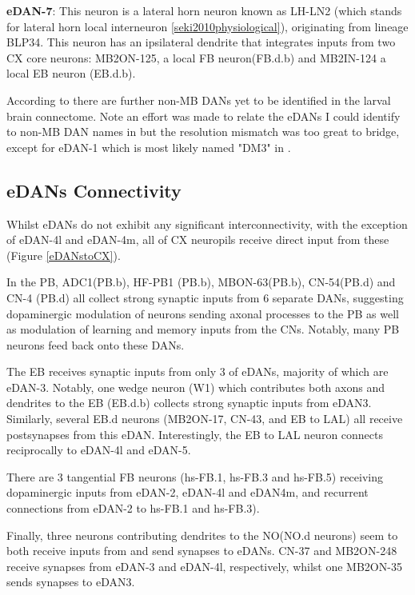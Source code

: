     \textbf{eDAN-7}: 
    This neuron is a lateral horn neuron known as LH-LN2 (which stands for lateral horn local interneuron \ref{seki2010physiological}), originating from lineage BLP34. This neuron has an ipsilateral dendrite that integrates inputs from two CX core neurons: MB2ON-125, a local FB neuron(FB.d.b) and MB2IN-124 a local EB neuron (EB.d.b). 

    According to \citep{selcho2009thgal4} there are further non-MB DANs yet to be identified in the larval brain connectome. Note an effort was made to relate the eDANs I could identify to non-MB DAN names in \citep{selcho2009thgal4} but the resolution mismatch was too great to bridge, except for eDAN-1 which is most likely named "DM3" in \citep{selcho2009thgal4}.

    \subsection{eDANs Connectivity}
     Whilst eDANs do not exhibit any significant interconnectivity, with the exception of eDAN-4l and eDAN-4m, all of CX neuropils receive direct input from these (Figure \ref{eDANstoCX}). 

    In the PB, ADC1(PB.b), HF-PB1 (PB.b), MBON-63(PB.b), CN-54(PB.d) and CN-4 (PB.d) all collect strong synaptic inputs from 6 separate DANs,  suggesting dopaminergic modulation of neurons sending axonal processes to the PB as well as modulation of learning and memory inputs from the CNs.  Notably, many PB neurons feed back onto these DANs.

    The EB receives synaptic inputs from only 3 of eDANs, majority of which are eDAN-3. Notably, one wedge neuron (W1) which contributes both axons and dendrites to the EB (EB.d.b) collects strong synaptic inputs from eDAN3. Similarly, several EB.d neurons (MB2ON-17, CN-43, and EB to LAL) all receive postsynapses from this eDAN. Interestingly, the EB to LAL neuron connects reciprocally to eDAN-4l and eDAN-5. 

    There are 3 tangential FB neurons (hs-FB.1, hs-FB.3 and hs-FB.5) receiving dopaminergic inputs from eDAN-2, eDAN-4l and eDAN4m, and recurrent connections from eDAN-2 to hs-FB.1 and hs-FB.3). 

    Finally, three neurons contributing dendrites to the NO(NO.d neurons) seem to both receive inputs from and send synapses to eDANs. CN-37 and MB2ON-248 receive synapses from eDAN-3 and eDAN-4l, respectively, whilst one MB2ON-35 sends synapses to eDAN3. 


